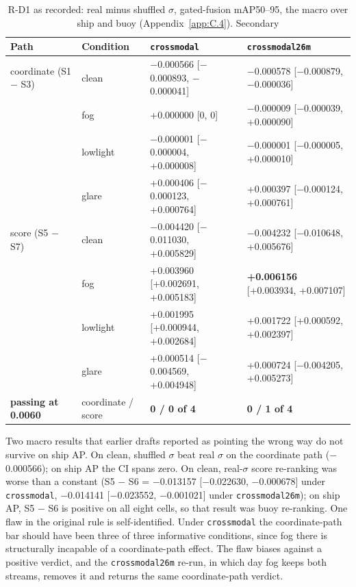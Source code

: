 \documentclass[journal,onecolumn]{IEEEtran}
\begin{document}
\begin{table}[htbp]
\centering
\small
\caption{R-D1 as recorded: real minus shuffled $\sigma$, gated-fusion mAP50--95, the macro over ship and buoy (Appendix~\ref{app:C.4}). Secondary}
\label{tab:12}
\begin{tabularx}{\linewidth}{ll>{\raggedright\arraybackslash}X>{\raggedright\arraybackslash}X}
\toprule
Path & Condition & \texttt{crossmodal} & \texttt{crossmodal26m} \\
\midrule
coordinate (S1 $-$ S3) & clean & $-$0.000566 [$-$0.000893, $-$0.000041] & $-$0.000578 [$-$0.000879, $-$0.000036] \\
 & fog & +0.000000 [0, 0] & $-$0.000009 [$-$0.000039, +0.000090] \\
 & lowlight & $-$0.000001 [$-$0.000004, +0.000008] & $-$0.000001 [$-$0.000005, +0.000010] \\
 & glare & +0.000406 [$-$0.000123, +0.000764] & +0.000397 [$-$0.000124, +0.000761] \\
score (S5 $-$ S7) & clean & $-$0.004420 [$-$0.011030, +0.005829] & $-$0.004232 [$-$0.010648, +0.005676] \\
 & fog & +0.003960 [+0.002691, +0.005183] & \textbf{+0.006156} [+0.003934, +0.007107] \\
 & lowlight & +0.001995 [+0.000944, +0.002684] & +0.001722 [+0.000592, +0.002397] \\
 & glare & +0.000514 [$-$0.004569, +0.004948] & +0.000724 [$-$0.004205, +0.005273] \\
\textbf{passing at 0.0060} & coordinate / score & \textbf{0 / 0 of 4} & \textbf{0 / 1 of 4} \\
\bottomrule
\end{tabularx}
\end{table}
Two macro results that earlier drafts reported as pointing the wrong way do not survive on ship AP. On clean, shuffled $\sigma$ beat real $\sigma$ on the coordinate path ($-$0.000566); on ship AP the CI spans zero. On clean, real-$\sigma$ score re-ranking was worse than a constant (S5 $-$ S6 = $-$0.013157 [$-$0.022630, $-$0.000678] under \texttt{crossmodal}, $-$0.014141 [$-$0.023552, $-$0.001021] under \texttt{crossmodal26m}); on ship AP, S5 $-$ S6 is positive on all eight cells, so that result was buoy re-ranking. One flaw in the original rule is self-identified. Under \texttt{crossmodal} the coordinate-path bar should have been three of three informative conditions, since fog there is structurally incapable of a coordinate-path effect. The flaw biases against a positive verdict, and the \texttt{crossmodal26m} re-run, in which day fog keeps both streams, removes it and returns the same coordinate-path verdict.
\end{document}
